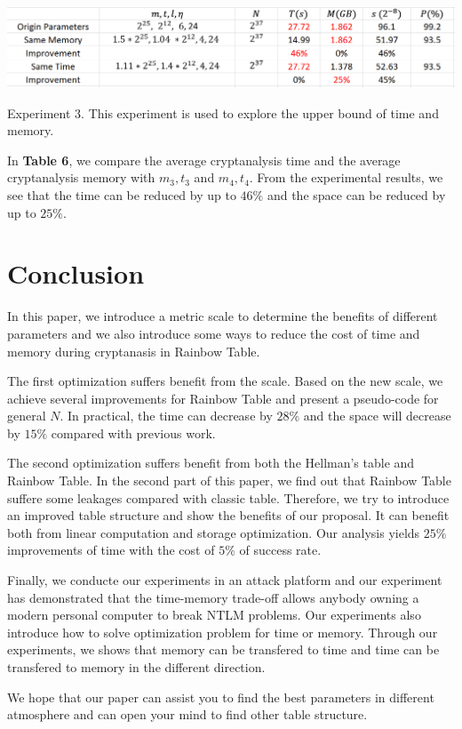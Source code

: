 \documentclass[runningheads,a4paper]{llncs}
\begin{document}
\begin{table}
\includegraphics[width=\linewidth]{table6}
\caption{Experiment 3. This experiment is used to explore the upper bound of time and memory.}
\end{table}

In \textbf{Table 6}, we compare the average cryptanalysis time and the average cryptanalysis memory with $m_3, t_3$ and $m_4, t_4$. From the experimental results, we see that the time can be reduced by up to $46\%$ and the space can be reduced by up to $25\%$.

\section{Conclusion}

In this paper, we introduce a metric scale to determine the benefits of different parameters and we also introduce some ways to reduce the cost of time and memory during cryptanasis in Rainbow Table. 

The first optimization suffers benefit from the scale. Based on the new scale, we achieve several improvements for Rainbow Table and present a pseudo-code for general $N$. In practical, the time can decrease by $28\%$ and the space will decrease by $15\%$ compared with previous work.

The second optimization suffers benefit from both the Hellman's table and Rainbow Table. In the second part of this paper, we find out that Rainbow Table suffere some leakages compared with classic table. Therefore, we try to introduce an improved table structure and show the benefits of our proposal. It can benefit both from linear computation and storage optimization. Our analysis yields $25\%$ improvements of time with the cost of $5\%$ of success rate. 

Finally, we conducte our experiments in an attack platform and our experiment has demonstrated that the time-memory trade-off allows anybody owning a modern personal computer to break NTLM problems. Our experiments also introduce how to solve optimization problem for time or memory. Through our experiments, we shows that memory can be transfered to time and time can be transfered to memory in the different direction.

We hope that our paper can assist you to find the best parameters in different atmosphere and can open your mind to find other table structure.


 
\end{document}
